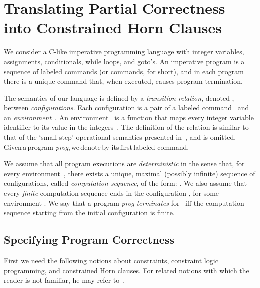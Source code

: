 \documentclass[english]{tlp}
\begin{document}
\section{Translating Partial Correctness into Constrained Horn Clauses}
\label{sec:encoding}


We consider a C-like imperative programming language with integer 
variables, assignments, conditionals, while loops, and goto's.
An imperative  program is a sequence of labeled commands (or commands, for short), 
and in each program there is a unique
 command that, when executed, causes program termination.

The semantics of our language is defined by a {\it transition relation},  denoted 
, between {\it configurations}. Each configuration is a pair
 of a labeled command~ and an 
{\it environment}~.
An {environment}~ is a function 
that maps every integer variable identifier  to its value  
in the integers~.
The definition of the relation  is similar to that of the
`{small step}' operational semantics presented in~\cite{Rey98},
and is omitted.
Given\,a\,program \textit{prog},\,we\,denote\,by 
 its\,first\,labeled command.

We assume that all program executions are {\it deterministic} in the sense that,
for every environment~,
there exists a unique, maximal (possibly infinite) 
sequence of configurations, called {\it computation sequence}, 
of the form: 
\mbox{} .
We also assume that every {\it finite} computation sequence ends in the configuration
, for some environment .
We say that  a program \textit{prog}  {\it terminates} for~ iff 
the computation sequence
starting from the initial configuration  
is finite.

\newpage

\subsection{Specifying Program Correctness}
\label{subsec:Spec}


First we need the following notions about constraints, 
constraint logic programming, and constrained Horn clauses. 
For related notions with which the reader is not
 familiar, he may refer to~\cite{JaM94,Llo87}.
\end{document}
